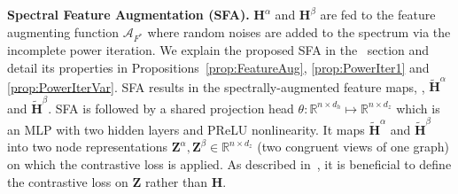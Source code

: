 
\vspace{0.1cm}
\noindent\textbf{Spectral Feature Augmentation (SFA).}
$\mathbf{H}^\alpha$ and $\mathbf{H}^\beta$ are  fed to the feature augmenting function $\mathcal{A}_{F^*}$  where random noises are added to the spectrum via the incomplete power iteration. We explain the proposed SFA in the ~section and detail its properties in Propositions~\ref{prop:FeatureAug}, \ref{prop:PowerIter1} and \ref{prop:PowerIterVar}. SFA results in the spectrally-augmented feature maps, \ie, $\widetilde{\mathbf{H}}^\alpha$ and $\widetilde{\mathbf{H}}^\beta$. SFA is followed by a shared projection head $\theta: \mathbb{R}^{n \times d_{h}} \longmapsto \mathbb{R}^{n \times d_{z}}$ which is an MLP with two hidden layers and PReLU nonlinearity. It maps $\widetilde{\mathbf{H}}^\alpha$ and $\widetilde{\mathbf{H}}^\beta$ into  two node representations
$\mathbf{Z}^{\alpha}, \mathbf{Z}^{\beta} \in \mathbb{R}^{n \times d_{z}}$ (two congruent views of one graph) on which the contrastive loss is applied. As described in~\cite{chen2020simple}, it is beneficial to define the contrastive loss on $\mathbf{Z}$ rather than $\mathbf{H}$.

